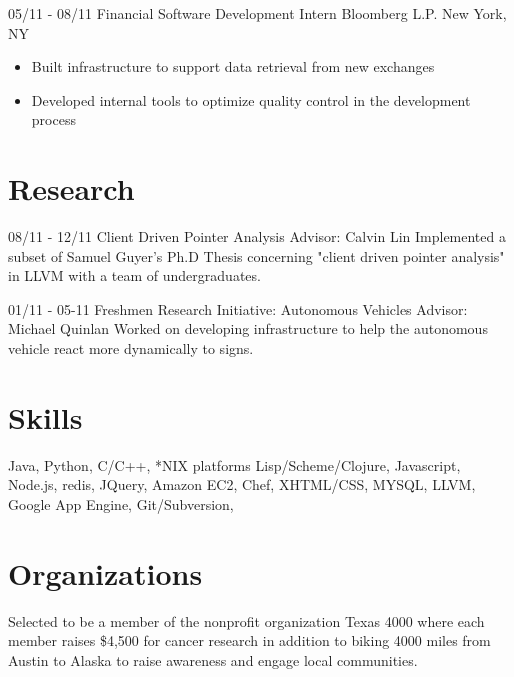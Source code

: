 \documentclass[11pt,letter,sans]{moderncv}
\begin{document}
\cventry
{05/11 - 08/11}
{Financial Software Development Intern}
{Bloomberg L.P.}
{New York, NY}
{}
{
  \begin{itemize}
    \item Built infrastructure to support data retrieval from new exchanges
    \item Developed internal tools to optimize quality control in the
      development process
\end{itemize}}

\section{Research}
\cventry
{08/11 - 12/11}
{Client Driven Pointer Analysis}
{Advisor: Calvin Lin}
{}
{}
{Implemented a subset of Samuel Guyer's Ph.D Thesis concerning "client driven
pointer analysis" in LLVM with a team of undergraduates.}

\cventry
{01/11 - 05-11}
{Freshmen Research Initiative: Autonomous Vehicles}
{Advisor: Michael Quinlan}
{}
{}
{Worked on developing infrastructure to help the autonomous vehicle react more
dynamically to signs.} 

\section{Skills}
{Java, Python, C/C++, *NIX platforms}
{Lisp/Scheme/Clojure, Javascript, Node.js, redis, JQuery, Amazon EC2, Chef,
XHTML/CSS, MYSQL, LLVM, Google App Engine, Git/Subversion, }


\section{Organizations}
{Selected to be a member of the nonprofit organization Texas 4000 where each
member raises \$4,500 for cancer research in addition to biking 4000 miles from
Austin to Alaska to raise awareness and engage local communities.}

\end{document}
